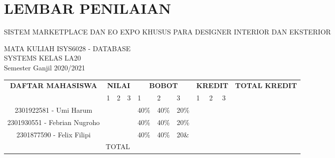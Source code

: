 \bgroup
\titleformat{\chapter}{\filcenter}{}{0pt}{\normalfont\Large\bfseries}  %
\titlespacing{\chapter}{0pt}{\parskip}{-\parskip}
\chapter*{LEMBAR PENILAIAN}
\thispagestyle{empty}
\begin{center}
	\Large
	SISTEM MARKETPLACE DAN EO EXPO KHUSUS PARA DESIGNER INTERIOR DAN EKSTERIOR
	
	\vspace{0.8cm}
	MATA KULIAH ISYS6028 - DATABASE \\
	SYSTEMS KELAS LA20 \\
	\vspace{0.8cm}
	Semester Ganjil 2020/2021
	
	\vspace{0.9cm}
	\renewcommand{\arraystretch}{1.6}
	\small
	\begin{tabular}{| c | p{0.42cm} | p{0.42cm} | p{0.42cm} | p{0.42cm} | p{0.42cm} | p{0.42cm} | p{0.42cm} | p{0.42cm} | p{0.42cm} | p{1.5cm} |}
		\hline
		\multirow{2}{*}{\textbf{DAFTAR MAHASISWA}} & \multicolumn{3}{|c|}{\textbf{NILAI}} & \multicolumn{3}{|c|}{\textbf{BOBOT}} & \multicolumn{3}{|c|}{\textbf{KREDIT}} & \multirow{2}{*}{\parbox{1.5cm}{\textbf{TOTAL KREDIT}}}\\ \cline{2-10}
			& \hfil 1 & 2 & 3 & 1 & 2 & 3 & 1 & 2 & 3 & \\[6pt] \hline
		
		2301922581 - Umi Harum & & & & 40\% & 40\% & 20\% & & & & \\ \hline
		2301930551 - Febrian Nugroho & & & & 40\% & 40\% & 20\% & & & & \\ \hline
		2301877590 - Felix Filipi & & & & 40\% & 40\% & 20\& & & & & \\ \hline
		\multicolumn{10}{|c|}{TOTAL} & \\ \hline
	\end{tabular}
\end{center}
